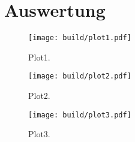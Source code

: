\section{Auswertung}
\label{sec:Auswertung}
\begin{figure}
  \centering
  \texttt{[image: build/plot1.pdf]}
  \caption{Plot1.}
  \label{fig:plot1}
\end{figure}
\begin{figure}
  \centering
  \texttt{[image: build/plot2.pdf]}
  \caption{Plot2.}
  \label{fig:plot2}
\end{figure}
\begin{figure}
  \centering
  \texttt{[image: build/plot3.pdf]}
  \caption{Plot3.}
  \label{fig:plot3}
\end{figure}
